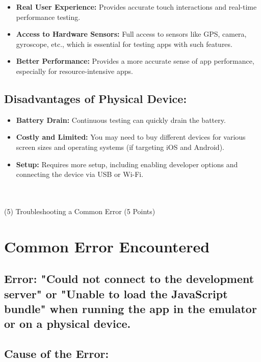 \documentclass{article}
\begin{document}
\begin{itemize}
    \item \textbf{Real User Experience:} Provides accurate touch interactions and real-time performance testing.
    \item \textbf{Access to Hardware Sensors:} Full access to sensors like GPS, camera, gyroscope, etc., which is essential for testing apps with such features.
    \item \textbf{Better Performance:} Provides a more accurate sense of app performance, especially for resource-intensive apps.
\end{itemize}

\subsection*{Disadvantages of Physical Device:}

\begin{itemize}
    \item \textbf{Battery Drain:} Continuous testing can quickly drain the battery.
    \item \textbf{Costly and Limited:} You may need to buy different devices for various screen sizes and operating systems (if targeting iOS and Android).
    \item \textbf{Setup:} Requires more setup, including enabling developer options and connecting the device via USB or Wi-Fi.\\\\\\
\end{itemize}

(5) Troubleshooting a Common Error (5 Points)\\
\section*{Common Error Encountered}

\subsection*{Error: "Could not connect to the development server" or "Unable to load the JavaScript bundle" when running the app in the emulator or on a physical device.}

\subsection*{Cause of the Error:}
\end{document}
